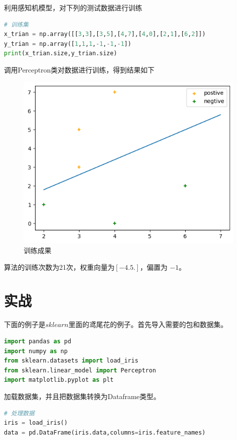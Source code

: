利用感知机模型，对下列的测试数据进行训练

\begin{lstlisting}[language=Python]
# 训练集
x_trian = np.array([[3,3],[3,5],[4,7],[4,0],[2,1],[6,2]])
y_trian = np.array([1,1,1,-1,-1,-1])
print(x_trian.size,y_trian.size)
\end{lstlisting}

调用Perceptron类对数据进行训练，得到结果如下

\begin{figure}[H]
    \centering
    \includegraphics[scale=0.5]{figures/perceptron1.png}
    \caption{训练成果}
\end{figure}

算法的训练次数为21次，权重向量为$[-4.  5.]$，偏置为 $-1$。

\section{实战}

下面的例子是$sklearn$里面的鸢尾花的例子。首先导入需要的包和数据集。

\begin{lstlisting}[language=Python]
import pandas as pd
import numpy as np
from sklearn.datasets import load_iris
from sklearn.linear_model import Perceptron
import matplotlib.pyplot as plt
\end{lstlisting}


加载数据集，并且把数据集转换为Dataframe类型。
\begin{lstlisting}[language=Python]
# 处理数据
iris = load_iris()
data = pd.DataFrame(iris.data,columns=iris.feature_names)
\end{lstlisting}

